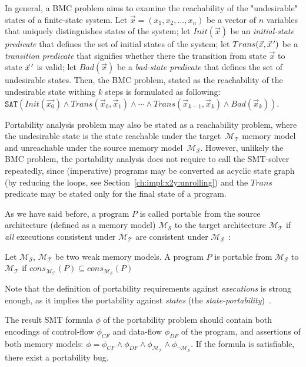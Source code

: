 In general, a BMC problem aims to examine the reachability of the "undesirable" states of a finite-state system. Let $\vec{x} = (x_1, x_2, ..., x_n)$ be a vector of $n$ variables that uniquely distinguishes states of the system; let $Init(\vec{x})$ be an \textit{initial-state predicate} that defines the set of initial states of the system; let $Trans(\vec{x}, \vec{x}\,')$ be a \textit{transition predicate} that signifies whether there the transition from state $\vec{x}$ to state $\vec{x}\,'$ is valid; let $Bad(\vec{x})$ be a \textit{bad-state predicate} that defines the set of undesirable states. Then, the BMC problem, stated as the reachability of the undesirable state withing $k$ steps is formulated as following:
$\mathtt{SAT}( Init(\vec{x_0}) \land Trans(\vec{x}_0, \vec{x}_1) \land \cdots \land Trans(\vec{x}_{k-1}, \vec{x}_k) \land Bad(\vec{x}_k) )$.

Portability analysis problem may also be stated as a reachability problem, where the undesirable state is the state reachable under the target~$\mathcal{M_T}$ memory model and unreachable under the source memory model~$\mathcal{M_S}$. However, unlikely the BMC problem, the portability analysis does not require to call the SMT-solver repeatedly, since (imperative) programs may be converted as acyclic state graph (by reducing the loops, see Section~\ref{ch:impl:x2y:unrolling}) and the $Trans$ predicate may be stated only for the final state of a program.

As we have said before, a program $P$ is called portable from the source architecture (defined as a memory model) $\mathcal{M_S}$ to the target architecture $\mathcal{M_T}$ if \textit{all} executions consistent under $\mathcal{M_T}$ are consistent under $\mathcal{M_S}$~\cite{Porthos17}:

\begin{definition}[Portability]
Let $\mathcal{M_S}$, $\mathcal{M_T}$ be two weak memory models. A program $P$ is portable from $\mathcal{M_S}$ to $\mathcal{M_T}$ if 
$cons_{\mathcal{M_T}}(P) \subseteq cons_{\mathcal{M_S}}(P)$
\end{definition}

Note that the definition of portability requirements against \textit{executions} is strong enough, as it implies the portability against \textit{states} (the \textit{state-portability})~\cite{Porthos17}.

The result SMT formula $\phi$ of the portability problem should contain both encodings of control-flow $\phi_{CF}$ and data-flow $\phi_{DF}$ of the program, and assertions of both memory models: $\phi = \phi_{CF} \land \phi_{DF} \land \phi_{\mathcal{M_T}} \land \phi_{\lnot\mathcal{M_S}}$. If the formula is satisfiable, there exist a portability bug.


